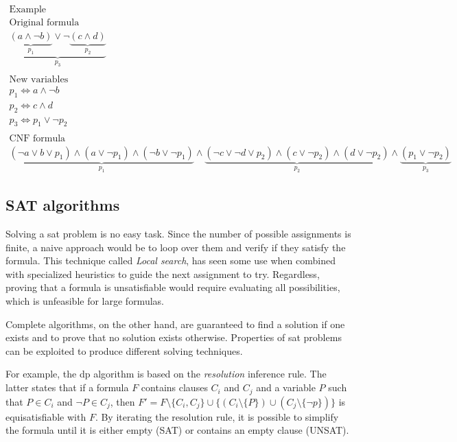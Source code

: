 \begin{multline*}
    \text{Example} \\
    \text{Original formula} \\
    \underbrace{\underbrace{(a \land \neg b)}_{p_1} \lor \neg \underbrace{(c \land d)}_{p_2}}_{p_3} \\
    \\
    \text{New variables} \\
    p_1 \iff a \land \neg b \\
    p_2 \iff c \land d \\
    p_3 \iff p_1 \lor \neg p_2 \\
    \\
    \text{CNF formula} \\
    \underbrace{(\neg a \lor b \lor p_1) \land (a \lor \neg p_1) \land (\neg b \lor \neg p_1)}_{p_1} \land \underbrace{(\neg c \lor \neg d \lor p_2) \land (c \lor \neg p_2) \land (d \lor \neg p_2)}_{p_2} \land \underbrace{(p_1 \lor \neg p_2)}_{p_3}
\end{multline*}

\subsection*{SAT algorithms}

Solving a \gls{sat} problem is no easy task.
Since the number of possible assignments is finite, a naive approach would be to loop over them and verify if they satisfy the formula.
This technique called \textit{Local search}, has seen some use when combined with specialized heuristics to guide the next assignment to try.
Regardless, proving that a formula is unsatisfiable would require evaluating all possibilities, which is unfeasible for large formulas.

Complete algorithms, on the other hand, are guaranteed to find a solution if one exists and to prove that no solution exists otherwise.
Properties of \gls{sat} problems can be exploited to produce different solving techniques.

For example, the \gls{dp} algorithm is based on the \textit{resolution} inference rule.
The latter states that if a formula $F$ contains clauses $C_i$ and $C_j$ and a variable $P$ such that $P \in C_i$ and $\neg P \in C_j$, then $F' = F \setminus \{ C_i, C_j \} \cup \{(C_i \setminus \{ P \}) \cup (C_j \setminus \{\neg p\})\}$ is equisatisfiable with $F$.
By iterating the resolution rule, it is possible to simplify the formula until it is either empty (SAT) or contains an empty clause (UNSAT).


